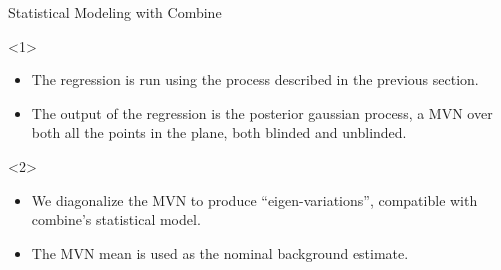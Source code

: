 \documentclass[10pt]{beamer}
\begin{document}
\begin{frame}[fragile, label=current]{Statistical Modeling with Combine}
  \begin{center}
  \end{center} 
  \begin{overlayarea}{\textwidth}{0.8\textwidth}
    \begin{center}
      \begin{onlyenv}<1>
        \begin{itemize}
        \item The regression is run using the process described in the previous section.
        \item The output of the regression is the posterior gaussian process, a MVN over both all the points in the plane, both blinded and unblinded.
        \end{itemize}
      \end{onlyenv}
      \begin{onlyenv}<2>
        \begin{itemize}
        \item We diagonalize the MVN to produce ``eigen-variations'', compatible with combine's statistical model.
        \item The MVN mean is used as the nominal background estimate.


\end{itemize}
\end{onlyenv}
\end{center}
\end{overlayarea}
\end{frame}
\end{document}
